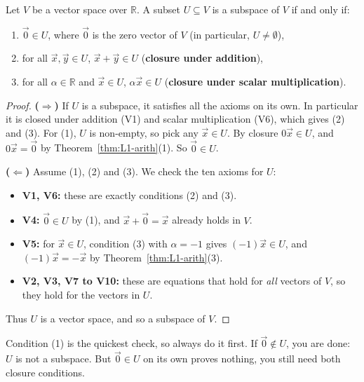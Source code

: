 \begin{theorem}
Let $V$ be a vector space over $\mathbb{R}$. A subset $U \subseteq V$ is a subspace of $V$ if and only if:
\begin{enumerate}
    \item $\vec{0} \in U$, where $\vec{0}$ is the zero vector of $V$ (in particular, $U \neq \emptyset$),
    \item for all $\vec{x}, \vec{y} \in U$, $\vec{x} + \vec{y} \in U$ \quad (\textbf{closure under addition}),
    \item for all $\alpha \in \mathbb{R}$ and $\vec{x} \in U$, $\alpha \vec{x} \in U$ \quad (\textbf{closure under scalar multiplication}).
\end{enumerate}
\end{theorem}

\begin{proof}
\textbf{($\Longrightarrow$)} If $U$ is a subspace, it satisfies all the axioms on its own. In particular it is closed under addition (V1) and scalar multiplication (V6), which gives (2) and (3). For (1), $U$ is non-empty, so pick any $\vec{x} \in U$. By closure $0\vec{x} \in U$, and $0\vec{x} = \vec{0}$ by Theorem~\ref{thm:L1-arith}(1). So $\vec{0} \in U$.

\medskip
\textbf{($\Longleftarrow$)} Assume (1), (2) and (3). We check the ten axioms for $U$:
\begin{itemize}
    \item \textbf{V1, V6:} these are exactly conditions (2) and (3).
    \item \textbf{V4:} $\vec{0} \in U$ by (1), and $\vec{x} + \vec{0} = \vec{x}$ already holds in $V$.
    \item \textbf{V5:} for $\vec{x} \in U$, condition (3) with $\alpha = -1$ gives $(-1)\vec{x} \in U$, and $(-1)\vec{x} = -\vec{x}$ by Theorem~\ref{thm:L1-arith}(3).
    \item \textbf{V2, V3, V7 to V10:} these are equations that hold for \emph{all} vectors of $V$, so they hold for the vectors in $U$.
\end{itemize}
Thus $U$ is a vector space, and so a subspace of $V$.
\end{proof}

\begin{remark}
Condition (1) is the quickest check, so always do it first. If $\vec{0} \notin U$, you are done: $U$ is not a subspace. But $\vec{0} \in U$ on its own proves nothing, you still need both closure conditions.
\end{remark}

